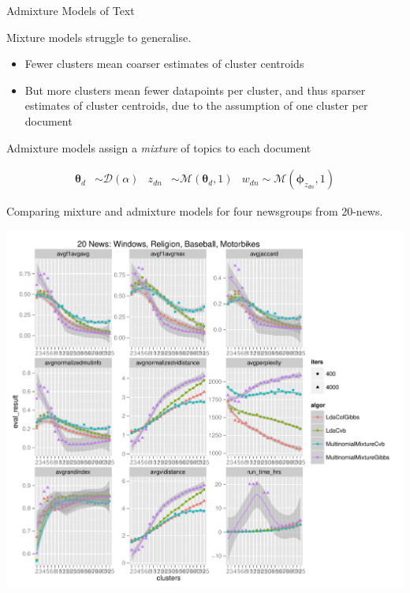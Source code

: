 \documentclass[xcolor=dvipsnames]{beamer}
\newcommand \vv[1] { \boldsymbol #1 }
\newcommand \mul[1]   { \mathcal{M} \left( {#1} \right) }
\newcommand \muln[2]  { \mathcal{M} \left( {#1},{#2} \right) }
\newcommand \dir[1]   { \mathcal{D} \left( {#1} \right) }
\newcommand \dir[1]   { \mathcal{D} \left( {#1} \right) }
\begin{document}
\begin{frame}{Admixture Models of Text}
 {
Mixture models struggle to generalise.
\begin{itemize}
    \item Fewer clusters mean coarser estimates of cluster centroids
    \item But more clusters mean fewer datapoints per cluster, and thus sparser estimates of cluster centroids, due to the assumption of one cluster per document
\end{itemize}
}



 {
Admixture models assign a \emph{mixture} of topics to each document\cite{BleiNgJordan2003} 

\begin{align*}
\vv{\theta}_d & \sim \dir{\alpha} & z_{dn} & \sim \muln{\vv{\theta}_d}{1} & w_{dn} \sim \mul{\vv{\phi}_{z_{dn}},1}
\end{align*}

}

 {
    \begin{figure}[t]
    \centering
    \resizebox{6cm}{!}{
        
    }
    \end{figure}
}

 {
    Comparing mixture and admixture models for four newsgroups from 20-news.

    \includegraphics[trim=12.3cm 7.3cm 0.5cm 7.7cm, clip=true]{Images/20news-2013-03-25.pdf}
}


\end{frame}
\end{document}
